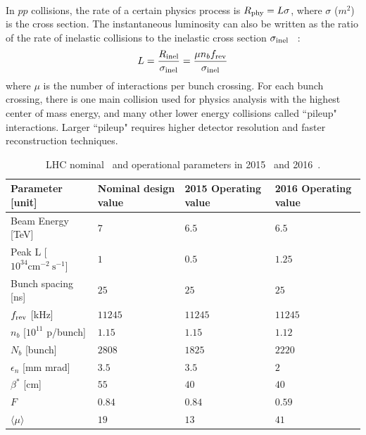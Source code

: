 \paragraph{} 
In $pp$ collisions, the rate of a certain physics process is $R_{\rm phy} = L\sigma$, where $\sigma$ ($m^2$) is the cross section.
The instantaneous luminosity can also be written as the ratio of the rate of inelastic collisions to the inelastic cross section $\sigma_{\rm inel}$ ~\cite{lumi-paper}:
\begin{equation}
\label{Ch2:eq-lumi2}
L = \frac{R_{\rm inel}}{\sigma_{\rm inel}} = \frac{\mu n_b f_{\rm rev}}{\sigma_{\rm inel}}
\end{equation}
where $\mu$ is the number of interactions per bunch crossing. 
For each bunch crossing, there is one main collision used for physics analysis with the highest center of mass energy, and many other lower energy collisions called ``pileup" interactions.
Larger ``pileup" requires higher detector resolution and faster reconstruction techniques.

\begin{table}[]
\centering
\caption[LHC nominal and operational parameters]{LHC nominal~\cite{LHCPaper} and operational parameters in 2015~\cite{LHC_2015} and 2016~\cite{LHC_2016}.}
\begin{tabular*}{\textwidth}{@{\extracolsep{\fill}}llll}
\hline
Parameter [unit]   & Nominal design value & 2015 Operating value  & 2016 Operating value\\
\hline\hline
Beam Energy [TeV]  & $7$  & $6.5$  & $6.5$  \\
Peak L [$10^{34} \text{cm}^{−2}~\text{s}^{-1}$]   & $1$ &   $0.5$  & $1.25$           \\
Bunch spacing [ns]             &      $25$  &  $25$ &      $25$ \\
$f_{\rm rev}$ [kHz]    &     $11245$  & $11245$  & $11245$ \\
$n_b$  [$10^{11}$ p/bunch]   & $1.15$ &  $1.15$ & $1.12$\\
$N_b$  [bunch]         & $2808$   &      $1825$ &      $2220$\\
$\epsilon_n$  [mm mrad]        & $3.5$ &  $3.5$  & $2$\\
$\beta^*$   [cm]         & $55$  &   $40$  & $40$\\
$F$        &      $0.84$  & $0.84$  &  $0.59$ \\
$\langle \mu \rangle$ & $19$ & $13$ & $41$ \\ \hline
\hline            
\end{tabular*}
\label{Ch2:tab-lhc}
\end{table}

